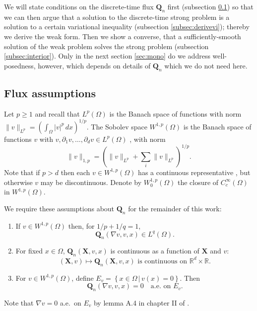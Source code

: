 \documentclass[final,leqno,onefignum,onetabnum]{siamltex1213bueler}
\newcommand\bQ{\mathbf{Q}}
\newcommand\bX{\mathbf{X}}
\renewcommand{\grad}{\nabla}
\newcommand\RR{\mathbb{R}}
\begin{document}
We will state conditions on the discrete-time flux $\bQ_n$ first (subsection \ref{subsec:fluxassumptions}) so that we can then argue that a solution to the discrete-time strong problem is a solution to a certain variational inequality (subsection \ref{subsec:derivevi}); thereby we derive the weak form.  Then we show a converse, that a sufficiently-smooth solution of the weak problem solves the strong problem (subsection \ref{subsec:interior}).  Only in the next section \ref{sec:mono} do we address well-posedness, however, which depends on details of $\bQ_n$ which we do not need here.

\subsection{Flux assumptions} \label{subsec:fluxassumptions}  Let $p\ge 1$ and recall that $L^p (\Omega)$ is the Banach space of functions with norm $\|v\|_{L^p} = \left(\int_\Omega |v|^p\,dx\right)^{1/p}$.  The Sobolev space $W^{1,p}(\Omega)$ is the Banach space of functions $v$ with $v,\partial_1 v,\dots,\partial_d v \in L^p(\Omega)$ \cite{Evans}, with norm
\begin{equation}
  \|v\|_{1,p} = \left(\|v\|_{L^p} + \sum_i \|v\|_{L^p}\right)^{1/p}.  \label{eq:norm}
\end{equation}
Note that if $p>d$ then each $v\in W^{1,p}(\Omega)$ has a continuous representative \cite[``Morrey's inequality'']{Evans}, but otherwise $v$ may be discontinuous.  Denote by $W_0^{1,p}(\Omega)$ the closure of $C_c^\infty(\Omega)$ in $W^{1,p}(\Omega)$.

We require these assumptions about $\bQ_n$ for the remainder of this work:

\medskip
\renewcommand{\labelenumi}{(\roman{enumi})}
\begin{enumerate}
\item If $v \in W^{1,p}(\Omega)$ then, for $1/p + 1/q = 1$,
\begin{equation}
\bQ_n(\grad v,v,x) \in L^q(\Omega). \label{eq:QisLq}
\end{equation}
\item For fixed $x\in \Omega$, $\bQ_n(\bX,v,x)$ is continuous as a function of $\bX$ and $v$:
\begin{equation}
(\bX,v) \mapsto \bQ_n(\bX,v,x) \text{ is continuous on } \RR^d \times \RR.  \label{eq:Qiscontinuous}
\end{equation}
\item For $v \in W^{1,p}(\Omega)$, define $E_v = \left\{x\in\Omega \,\big|\, v(x) = 0\right\}$.  Then
\begin{equation}
\bQ_n(\grad v,v,x)=0 \quad \text{a.e.~on } E_v. \label{eq:Qiszero}
\end{equation}
\end{enumerate}
Note that $\grad v = 0$ a.e.~on $E_v$ by lemma A.4 in chapter II of \cite{KinderlehrerStampacchia}.
\end{document}
